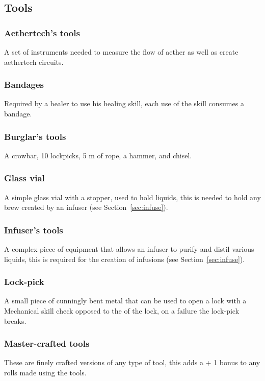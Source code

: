\documentclass[a4paper,11pt,oneside]{book}
\newcommand{\textlf}[1]{\textbf{\titlecap{#1}}}
\begin{document}
\subsection{Tools}

\subsubsection{Aethertech's tools}
A set of instruments needed to measure the flow of aether as well as create aethertech circuits.

\subsubsection{Bandages}
Required by a healer to use his healing skill, each use of the skill consumes a bandage.

\subsubsection{Burglar's tools}
A crowbar, 10 lockpicks, 5 m of rope, a hammer, and chisel.

\subsubsection{Glass vial}
A simple glass vial with a stopper, used to hold liquids, this is needed to hold any brew created by an infuser (see Section~\ref{sec:infuse}).

\subsubsection{Infuser's tools}
A complex piece of equipment that allows an infuser to purify and distil various liquids, this is required for the creation of infusions (see Section~\ref{sec:infuse}).

\subsubsection{Lock-pick}
A small piece of cunningly bent metal that can be used to open a lock with a Mechanical skill check opposed to the \textlf{difficulty} of the lock, on a failure the lock-pick breaks.

\subsubsection{Master-crafted tools}
These are finely crafted versions of any type of tool, this adds a + 1 bonus to any rolls made using the tools.
\end{document}
